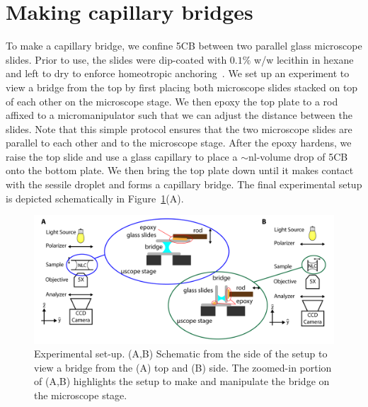 \section{Making capillary bridges}
To make a capillary bridge, we confine 5CB between two parallel glass microscope slides.
Prior to use, the slides were dip-coated with $0.1\%$ w/w lecithin in hexane and left to dry to enforce homeotropic anchoring~\cite{RN140}.
We set up an experiment to view a bridge from the top by first placing both microscope slides stacked on top of each other on the microscope stage.
We then epoxy the top plate to a rod affixed to a micromanipulator such that we can adjust the distance between the slides.
Note that this simple protocol ensures that the two microscope slides are parallel to each other and to the microscope stage.
After the epoxy hardens, we raise the top slide and use a glass capillary to place a $\sim$nl-volume drop of 5CB onto the bottom plate.
We then bring the top plate down until it makes contact with the sessile droplet and forms a capillary bridge.
The final experimental setup is depicted schematically in Figure~\ref{f:5-BuildSchemaic}(A).
\begin{figure}
  \centering
  \includegraphics{figures/C5/Ch5-Figs_BuildSchematic.png}
  \caption{Experimental set-up.
  (A,B) Schematic from the side of the setup to view a bridge from the (A) top and (B) side.
  The zoomed-in portion of (A,B) highlights the setup to make and manipulate the bridge on the microscope stage.}\label{f:5-BuildSchemaic}
\end{figure}

